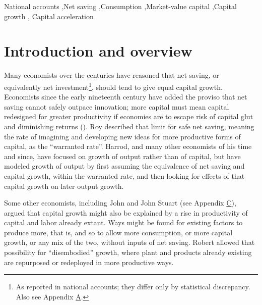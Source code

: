 \documentclass[a4paper,fleqn]{latex_styles/cas-sc}
\begin{document}

\begin{keywords}
National accounts \sep Net
saving \sep Consumption \sep Market-value capital \sep Capital
growth \sep 
Capital acceleration

\end{keywords}

\maketitle

\hypertarget{introduction}{%
\section{Introduction and overview}\label{introduction}}

Many economists over the centuries have reasoned that net saving, or equivalently net investment\footnote{As reported in national accounts; they differ only by statistical discrepancy. Also see Appendix \hyperref[appendix-a]{A}.}, should tend to give equal capital growth. Economists since the early
nineteenth century have added the proviso that net saving cannot
safely outpace innovation; more capital must mean capital redesigned for
greater productivity if economies are to escape risk of capital glut and
diminishing returns
(\citet{westEssayApplicationCapital1815, ricardoEssayProfitsVol1815, malthusEnquiryNatureProgress1815}).
Roy \citet{harrodEssayDynamicTheory1939}
described that limit for safe net saving, meaning the rate of
imagining and developing new ideas for more productive forms of capital,
as the ``warranted rate''. Harrod, and many other economists of his time
and since, have focused on growth of output rather than of capital, but
have modeled growth of output by first assuming the equivalence of net
saving and capital growth, within the warranted rate, and then
looking for effects of that capital growth on later output growth.

Some other economists, including John  \citet{raeNewPrinciplesPolitical1834} and John Stuart 
\citet{millPrinciplesPoliticalEconomy1848} (see Appendix \hyperref[appendix-c]{C}), argued that capital growth might also be explained
by a rise in productivity of capital and labor already extant. Ways
might be found for existing factors to produce more, that is, and so to
allow more consumption, or more capital growth, or any mix of the two,
without inputs of net saving. Robert
\citet{solowTECHNICALCHANGEAGGREGATE1957} allowed that possibility for
``disembodied'' growth, where plant and products already existing are
repurposed or redeployed in more productive ways.
\end{document}
